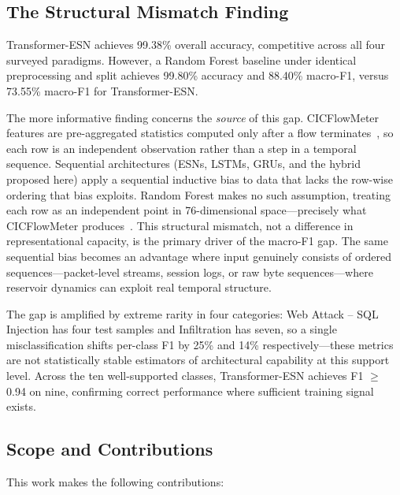 \documentclass[5p,times]{elsarticle}
\begin{document}
	\subsection{The Structural Mismatch Finding}
	
	Transformer-ESN achieves 99.38\% overall accuracy, competitive across
	all four surveyed paradigms. However, a Random Forest baseline under
	identical preprocessing and split achieves 99.80\% accuracy and 88.40\%
	macro-F1, versus 73.55\% macro-F1 for Transformer-ESN.
	
	The more informative finding concerns the \textit{source} of this gap.
	CICFlowMeter features are pre-aggregated statistics computed only after
	a flow terminates~\cite{cicids2017}, so each row is an independent
	observation rather than a step in a temporal sequence. Sequential
	architectures (ESNs, LSTMs, GRUs, and the hybrid proposed here) apply a
	sequential inductive bias to data that lacks the row-wise ordering that
	bias exploits. Random Forest makes no such assumption, treating each row
	as an independent point in 76-dimensional space---precisely what
	CICFlowMeter produces~\cite{kurniabudi2020,xgb2023}. This structural mismatch,
	not a difference in representational capacity, is the primary driver of
	the macro-F1 gap. The same sequential bias becomes an advantage where
	input genuinely consists of ordered sequences---packet-level streams,
	session logs, or raw byte sequences---where reservoir dynamics can
	exploit real temporal structure.
	
	The gap is amplified by extreme rarity in four categories: Web Attack --
	SQL Injection has four test samples and Infiltration has seven, so a
	single misclassification shifts per-class F1 by 25\% and 14\%
	respectively---these metrics are not statistically stable estimators of
	architectural capability at this support level. Across the ten
	well-supported classes, Transformer-ESN achieves F1 $\geq$ 0.94 on nine,
	confirming correct performance where sufficient training signal exists.
	
	\subsection{Scope and Contributions}
	
	This work makes the following contributions:
	
\end{document}
